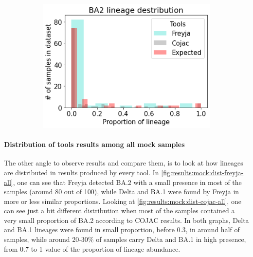 \begin{figure}[H]
            \hfill
            \begin{subfigure}[b]{0.3\textwidth}
            \includegraphics[width=1\textwidth]{figures/results/mock/distr-ba2.png}
            \label{fig:results:mock:dist-ba1-all}
            \end{subfigure}
        \end{figure}
        
        \paragraph{Distribution of tools results among all mock samples}
        The other angle to observe results and compare them, is to look at how lineages are distributed in results produced by every tool. In \cref{fig:results:mock:dist-freyja-all}, one can see that Freyja detected BA.2 with a small presence in most of the samples (around 80 out of 100), while Delta and BA.1 were found by Freyja in more or less similar proportions. Looking at \cref{fig:results:mock:dist-cojac-all}, one can see just a bit different distribution when most of the samples contained a very small proportion of BA.2 according to COJAC results. In both graphs, Delta and BA.1 lineages were found in small proportion, before 0.3, in around half of samples, while around 20-30\% of samples carry Delta and BA.1 in high presence, from 0.7 to 1 value of the proportion of lineage abundance.
        
